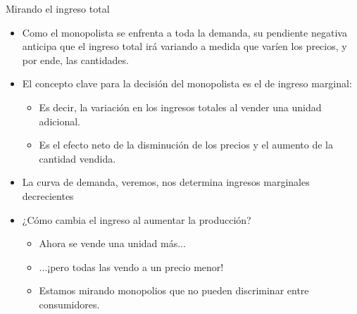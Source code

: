 \documentclass{beamer}
\begin{document}
\begin{frame}{Mirando el ingreso total}
    \begin{itemize}
        \item Como el monopolista se enfrenta a toda la demanda, su pendiente negativa anticipa que el ingreso total irá variando a medida que varíen los precios, y por ende, las cantidades.
        \item El concepto clave para la decisión del monopolista es el de ingreso marginal:
        \begin{itemize}
            \item Es decir, la variación en los ingresos totales al vender una unidad adicional.
            \item Es el efecto neto de la disminución de los precios y el aumento de la cantidad vendida.
        \end{itemize}
        \item La curva de demanda, veremos, nos determina ingresos marginales decrecientes
        
        \item ¿Cómo cambia el ingreso al aumentar la producción?
        \begin{itemize}
            \item Ahora se vende una unidad más...
            \item ...¡pero todas las vendo a un precio menor!
            \item Estamos mirando monopolios que no pueden discriminar entre consumidores.
        \end{itemize}
    \end{itemize}
\end{frame}
\end{document}
